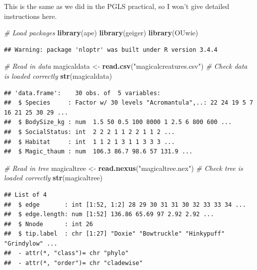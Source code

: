 \documentclass[]{book}
\newenvironment{Shaded}{\begin{snugshade}}{\end{snugshade}}
\newcommand{\KeywordTok}[1]{\textcolor[rgb]{0.13,0.29,0.53}{\textbf{{#1}}}}
\newcommand{\StringTok}[1]{\textcolor[rgb]{0.31,0.60,0.02}{{#1}}}
\newcommand{\CommentTok}[1]{\textcolor[rgb]{0.56,0.35,0.01}{\textit{{#1}}}}
\newcommand{\NormalTok}[1]{{#1}}
\theoremstyle{definition}
\theoremstyle{definition}
\theoremstyle{definition}
\theoremstyle{remark}
\begin{document}
This is the same as we did in the PGLS practical, so I won't give
detailed instructions here.

\begin{Shaded}
\begin{Highlighting}[]
\CommentTok{# Load packages}
\KeywordTok{library}\NormalTok{(ape)}
\KeywordTok{library}\NormalTok{(geiger)}
\KeywordTok{library}\NormalTok{(OUwie)}
\end{Highlighting}
\end{Shaded}

\begin{verbatim}
## Warning: package 'nloptr' was built under R version 3.4.4
\end{verbatim}

\begin{Shaded}
\begin{Highlighting}[]
\CommentTok{# Read in data}
\NormalTok{magicaldata <-}\StringTok{ }\KeywordTok{read.csv}\NormalTok{(}\StringTok{"magicalcreatures.csv"}\NormalTok{)}
\CommentTok{# Check data is loaded correctly}
\KeywordTok{str}\NormalTok{(magicaldata)}
\end{Highlighting}
\end{Shaded}

\begin{verbatim}
## 'data.frame':    30 obs. of  5 variables:
##  $ Species     : Factor w/ 30 levels "Acromantula",..: 22 24 19 5 7 16 21 25 30 29 ...
##  $ BodySize_kg : num  1.5 50 0.5 100 8000 1 2.5 6 800 600 ...
##  $ SocialStatus: int  2 2 2 1 1 2 2 1 1 2 ...
##  $ Habitat     : int  1 1 2 1 3 1 1 3 3 3 ...
##  $ Magic_thaum : num  106.3 86.7 98.6 57 131.9 ...
\end{verbatim}

\begin{Shaded}
\begin{Highlighting}[]
\CommentTok{# Read in tree}
\NormalTok{magicaltree <-}\StringTok{ }\KeywordTok{read.nexus}\NormalTok{(}\StringTok{"magicaltree.nex"}\NormalTok{) }
\CommentTok{# Check tree is loaded correctly}
\KeywordTok{str}\NormalTok{(magicaltree)}
\end{Highlighting}
\end{Shaded}

\begin{verbatim}
## List of 4
##  $ edge       : int [1:52, 1:2] 28 29 30 31 31 30 32 33 33 34 ...
##  $ edge.length: num [1:52] 136.86 65.69 97 2.92 2.92 ...
##  $ Nnode      : int 26
##  $ tip.label  : chr [1:27] "Doxie" "Bowtruckle" "Hinkypuff" "Grindylow" ...
##  - attr(*, "class")= chr "phylo"
##  - attr(*, "order")= chr "cladewise"
\end{verbatim}
\end{document}
